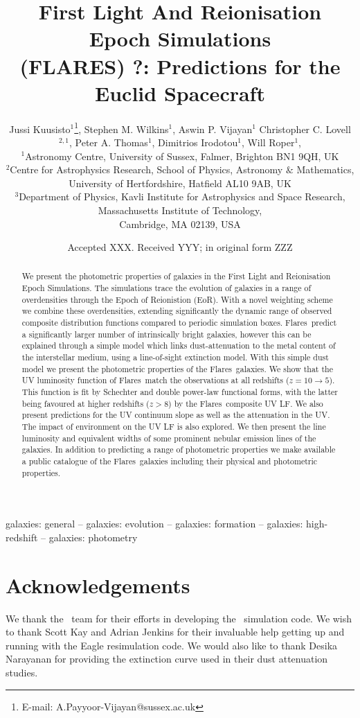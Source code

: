 \documentclass[fleqn,usenatbib]{mnras}
\title[FLARES ?]{First Light And Reionisation Epoch Simulations \\(FLARES) ?: Predictions for the Euclid Spacecraft}
\author[Kuusisto et al.]{Jussi Kuusisto$^{1}$\thanks{E-mail: A.Payyoor-Vijayan@sussex.ac.uk},
Stephen M. Wilkins$^{1}$,
Aswin P. Vijayan$^{1}$
Christopher C. Lovell$^{2,1}$,
\newauthor
Peter A. Thomas$^{1}$,
Dimitrios Irodotou$^{1}$,
Will Roper$^{1}$,
\\
$^{1}$Astronomy Centre, University of Sussex, Falmer, Brighton BN1 9QH, UK\\
$^{2}$Centre for Astrophysics Research, School of Physics, Astronomy $\&$ Mathematics, \\University of Hertfordshire, Hatfield AL10 9AB, UK\\
$^{3}$Department of Physics, Kavli Institute for Astrophysics and Space Research, Massachusetts Institute of Technology,\\Cambridge, MA 02139, USA
}
\date{Accepted XXX. Received YYY; in original form ZZZ}
\newcommand{\eagle}{\mbox{\sc{Eagle}}}
\newcommand{\flares}{\mbox{\sc Flares}}
\begin{document}
\label{firstpage}
\pagerange{\pageref{firstpage}--\pageref{lastpage}}
\maketitle

\begin{abstract}
We present the photometric properties of galaxies in the First Light and Reionisation Epoch Simulations. The simulations trace the evolution of galaxies in a range of overdensities through the Epoch of Reionistion (EoR). With a novel weighting scheme we combine these overdensities, extending significantly the dynamic range of observed composite distribution functions compared to periodic simulation boxes. \flares\, predict a significantly larger number of intrinsically bright galaxies, however this can be explained through a simple model which links dust-attenuation to the metal content of the interstellar medium, using a line-of-sight extinction model. With this simple dust model we present the photometric properties of the \flares\, galaxies. We show that the UV luminosity function of \flares\, match the observations at all redshifts ($z=10\to5$). This function is fit by Schechter and double power-law functional forms, with the latter being favoured at higher redshifts ($z>8$) by the \flares\, composite UV LF. We also present predictions for the UV continuum slope as well as the attenuation in the UV. The impact of environment on the UV LF is also explored. We then present the line luminosity and equivalent widths of some prominent nebular emission lines of the galaxies. In addition to predicting a range of photometric properties we make available a public catalogue of the \flares\, galaxies including their physical and photometric properties.
\end{abstract}

\begin{keywords}
galaxies: general -- galaxies: evolution -- galaxies: formation -- galaxies: high-redshift -- galaxies: photometry
\end{keywords}






\section*{Acknowledgements}
We thank the \eagle\, team for their efforts in developing the \eagle\, simulation code. We wish to thank Scott Kay and Adrian Jenkins for their invaluable help getting up and running with the Eagle resimulation code. We would also like to thank Desika Narayanan for providing the extinction curve used in their dust attenuation studies.
\end{document}
